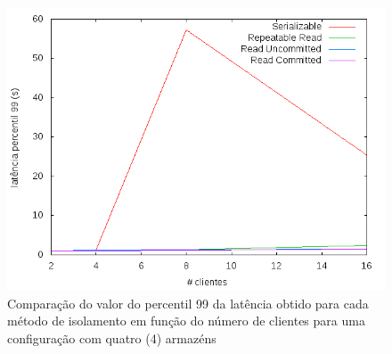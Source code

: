 \begin{figure}[!h]
\centering
\includegraphics[scale=.5]{img/questao-1/diff-lat-pct99-4-arm}
\caption{Comparação do valor do percentil 99 da latência obtido para cada método de isolamento em função do número de clientes para uma configuração com quatro (4) armazéns}
\end{figure}